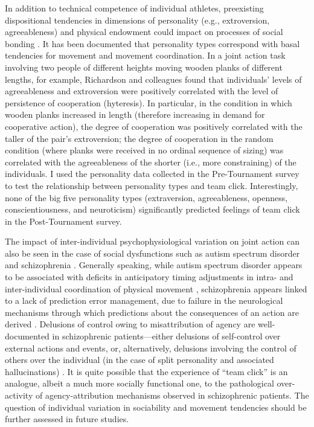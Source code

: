 \begin{CJK}{UTF8}{gbsn}
  In addition to technical competence of individual athletes, preexisting dispositional tendencies in dimensions of personality (e.g., extroversion, agreeableness) and physical endowment could impact on processes of social bonding \citep{Marsh2009,VonRueden2015}.   It has been documented that personality types correspond with basal tendencies for movement and movement coordination. In a joint action task involving two people of different heights moving wooden planks of different lengths, for example, Richardson and colleagues \textcite{Richardson2007} found that individuals’ levels of agreeableness and extroversion were positively correlated with the level of persistence of cooperation (hyteresis).  In particular, in the condition in which wooden planks increased in length (therefore increasing in demand for cooperative action), the degree of cooperation was positively correlated with the taller of the pair’s extroversion; the degree of cooperation in the random condition (where planks were received in no ordinal sequence of sizing) was correlated with the agreeableness of the shorter (i.e., more constraining) of the individuals.  I used the personality data collected in the Pre-Tournament survey to test the relationship between personality types and team click. Interestingly, none of the big five personality types (extraversion, agreeableness, openness, conscientiousness, and neuroticism) significantly predicted feelings of team click in the Post-Tournament survey.

  The impact of inter-individual psychophysiological variation on joint action can also be seen in the case of social dysfunctions such as autism spectrum disorder \citep{Isenhower2012} and schizophrenia \citep{Varlet2012}.  Generally speaking,  while autism spectrum disorder appears to be associated with deficits in anticipatory timing adjustments in intra- and inter-individual coordination of physical movement \citep{Martineau2010}, schizophrenia appears linked to a lack of prediction error management, due to failure in the neurological mechanisms through which predictions about the consequences of an action are derived \citep{Frith2000}.  Delusions of control owing to misattribution of agency are well-documented in schizophrenic patients---either delusions of self-control over external actions and events, or, alternatively, delusions involving the control of others over the individual (in the case of split personality and associated hallucinations) \citep{Frith2007}. It is quite possible that the experience of ``team click'' is an analogue, albeit a much more socially functional one, to the pathological over-activity of agency-attribution mechanisms observed in schizophrenic patients.  The question of individual variation in sociability and movement tendencies should be further assessed in future studies.


\end{CJK}
